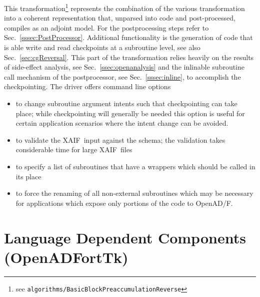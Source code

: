 \documentclass{book}
\newcommand{\OpenADF}{OpenAD/F}
\newcommand{\OpenADFortTk}{OpenADFortTk}
\newcommand{\xaif}{XAIF}
\newcommand{\refsec}[1]{{Sec.~\ref{#1}}}
\begin{document}
This transformation\footnote{
  see {\tt algorithms/BasicBlockPreaccumulationReverse}
}
represents the combination of the various transformation 
into a coherent representation that, unparsed into code and post-processed, compiles 
as an adjoint model. 
For the postprocessing steps refer to \refsec{sssec:PostProcessor}.
Additional functionality is the generation of code that is able write and 
read checkpoints at a subroutine level, see also \refsec{sec:cgReversal}. 
This part of the transformation relies heavily on the results of side-effect analysis, see 
\refsec{ssec:openanalysis} and the inlinable subroutine call mechanism of 
the postprocessor, see \refsec{sssec:inline}, to accomplish the checkpointing. 
The driver offers command line options
\begin{itemize}
\item to change subroutine argument intents 
  such that checkpointing can take place; while checkpointing will 
  generally be needed this option is useful 
  for certain application scenarios where the intent change can be avoided.
\item  to validate the \xaif\ input against the schema; the validation takes 
  considerable time for large \xaif\ files
\item to specify a list of subroutines 
  that have a wrappers which should be called in its place
\item to force the renaming of all non-external subroutines which may be necessary 
  for applications which expose only portions of the code to \OpenADF.
\end{itemize}

\section{Language Dependent Components (\OpenADFortTk)}\label{sec:fortfe}
\end{document}
